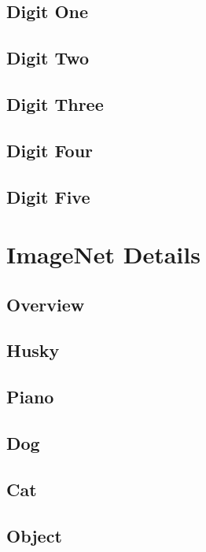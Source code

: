 \documentclass[11pt]{article} 	%
\theoremstyle{definition}
\begin{document}
\subsection{Digit One}

\subsection{Digit Two}

\subsection{Digit Three}

\subsection{Digit Four}

\subsection{Digit Five}

\section{ImageNet Details}

\subsection{Overview}

\subsection{Husky}

\subsection{Piano}

\subsection{Dog}

\subsection{Cat}

\subsection{Object}
\end{document}
